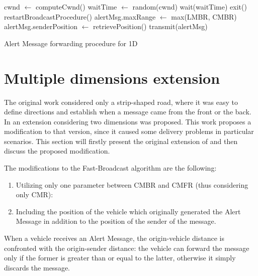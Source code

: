 		\begin{algorithm}[H]
			\begin{algorithmic}[1]
				\State cwnd $\gets$ computeCwnd()
				\State waitTime $\gets$ random(cwnd)
				\State wait(waitTime)
				\State exit()
				\State restartBroadcastProcedure()
				\Else 
				\State alertMsg.maxRange $\gets$ max(LMBR, CMBR)
				\State alertMsg.senderPosition $\gets$ retrievePosition()
				\State transmit(alertMsg)
				\EndIf 
			\end{algorithmic}
			\caption{Alert Message forwarding procedure for 1D}
			\label{alg:alert-message-forwarding-1d}
		\end{algorithm}
	
	\section{Multiple dimensions extension}
		\label{sec:fb-multiple-dimensions}
		The original work \cite{4199282} considered only a strip-shaped road, where it was easy to define directions and establish when a message came from the front or the back. In \cite{BAR2017} an extension considering two dimensions was proposed. This work proposes a modification to that version, since it caused some delivery problems in particular scenarios. This section will firstly present the original extension of \cite{BAR2017} and then discuss the proposed modification.
		
		
		The modifications to the Fast-Broadcast algorithm are the following:
		\begin{enumerate}
			\item Utilizing only one parameter between CMBR and CMFR (thus considering only CMR):
			\item Including the position of the vehicle which originally generated the Alert Message in addition to the position of the sender of the message.
		\end{enumerate}
		
		
		When a vehicle receives an Alert Message, the origin-vehicle distance is confronted with the origin-sender distance: the vehicle can forward the message only if the former is greater than or equal to the latter, otherwise it simply discards the message.
		
